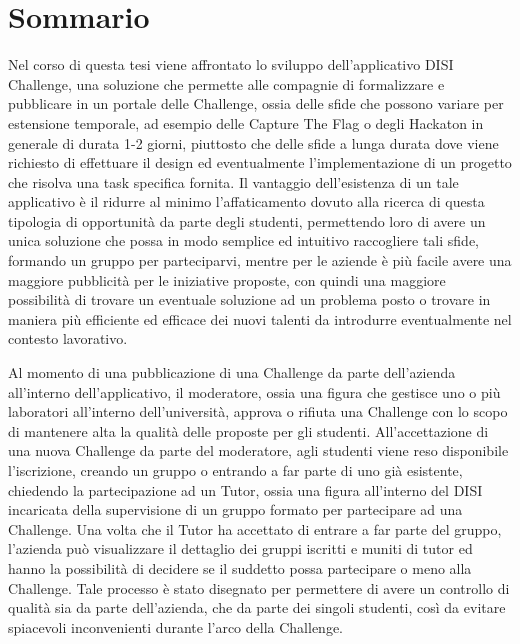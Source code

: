 \chapter*{Sommario} %
\label{sommario}






Nel corso di questa tesi viene affrontato lo sviluppo dell'applicativo DISI Challenge, una soluzione che permette alle compagnie di formalizzare e pubblicare in un portale delle Challenge, ossia delle sfide che possono variare per estensione temporale, ad esempio delle Capture The Flag o degli Hackaton in generale di durata 1-2 giorni, piuttosto che delle sfide a lunga durata dove viene richiesto di effettuare il design ed eventualmente l'implementazione di un progetto che risolva una task specifica fornita. Il vantaggio dell'esistenza di un tale applicativo è il ridurre al minimo l'affaticamento dovuto alla ricerca di questa tipologia di opportunità da parte degli studenti, permettendo loro di avere un unica soluzione che possa in modo semplice ed intuitivo raccogliere tali sfide, formando un gruppo per parteciparvi, mentre per le aziende è più facile avere una maggiore pubblicità per le iniziative proposte, con quindi una maggiore possibilità di trovare un eventuale soluzione ad un problema posto o trovare in maniera più efficiente ed efficace dei nuovi talenti da introdurre eventualmente nel contesto lavorativo.

Al momento di una pubblicazione di una Challenge da parte dell'azienda all'interno dell'applicativo, il moderatore, ossia una figura che gestisce uno o più laboratori all'interno dell'università, approva o rifiuta una Challenge con lo scopo di mantenere alta la qualità delle proposte per gli studenti. All'accettazione di una nuova Challenge da parte del moderatore, agli studenti viene reso disponibile l'iscrizione, creando un gruppo o entrando a far parte di uno già esistente, chiedendo la partecipazione ad un Tutor, ossia una figura all'interno del DISI incaricata della supervisione di un gruppo formato per partecipare ad una Challenge. Una volta che il Tutor ha accettato di entrare a far parte del gruppo, l'azienda può visualizzare il dettaglio dei gruppi iscritti e muniti di tutor ed hanno la possibilità di decidere se il suddetto possa partecipare o meno alla Challenge. Tale processo è stato disegnato per permettere di avere un controllo di qualità sia da parte dell'azienda, che da parte dei singoli studenti, così da evitare spiacevoli inconvenienti durante l'arco della Challenge.


